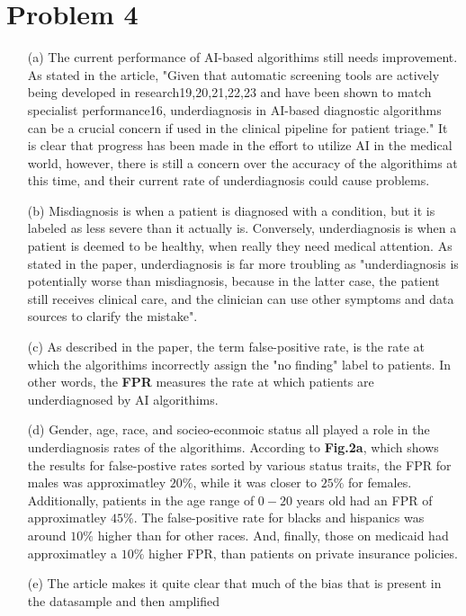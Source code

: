 \documentclass[12pt, letterpaper]{article}
\begin{document}
\section*{Problem 4}
\begin{enumerate}
    \item [(a)] The current performance of AI-based algorithims still needs improvement. As stated in the article, 
    "Given that automatic screening tools are actively being developed in research19,20,21,22,23 and have been shown 
    to match specialist performance16, underdiagnosis in AI-based diagnostic algorithms can be a crucial concern if 
    used in the clinical pipeline for patient triage." It is clear that progress has been made in the effort to utilize
    AI in the medical world, however, there is still a concern over the accuracy of the algorithims at this time, and their 
    current rate of underdiagnosis could cause problems. 
    \item [(b)] Misdiagnosis is when a patient is diagnosed with a condition, but it is labeled as less severe 
    than it actually is. Conversely, underdiagnosis is when a patient is deemed to be healthy, when really they 
    need medical attention. As stated in the paper, underdiagnosis is far more troubling as "underdiagnosis is 
    potentially worse than misdiagnosis, because in the latter case, the patient still receives clinical care, 
    and the clinician can use other symptoms and data sources to clarify the mistake". 
    \item [(c)] As described in the paper, the term false-positive rate, is the rate at which the algorithims 
    incorrectly assign the "no finding" label to patients. In other words, the {\bf FPR} measures the rate at which patients 
    are underdiagnosed by AI algorithims.
    \item [(d)] Gender, age, race, and socieo-econmoic status all played a role in the underdiagnosis rates of the 
    algorithims. According to {\bf Fig.2a}, which shows the results for false-postive rates sorted by various status traits, 
    the FPR for males was approximatley $20\%$, while it was closer to $25\%$ for females. Additionally, patients in the 
    age range of $0-20$ years old had an FPR of approximatley $45\%$. The false-positive rate for blacks and hispanics was 
    around $10\%$ higher than for other races. And, finally, those on medicaid had approximatley a $10\%$ higher FPR, than 
    patients on private insurance policies. 
    \item [(e)] The article makes it quite clear that much of the bias that is present in the datasample and then amplified 

\end{enumerate}
\end{document}
